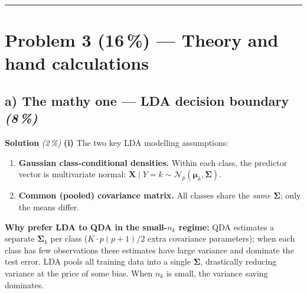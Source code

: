 \documentclass[11pt,a4paper]{article}
\newcommand{\points}[1]{\textbf{(#1\,\%)}}
\newcommand{\subpoints}[1]{\textit{(#1\,\%)}}
\newcommand{\sol}{\noindent\textbf{Solution}}
\begin{document}
\vspace{0.6em}
\hrule
\vspace{1em}

\section*{Problem 3 \points{16} --- Theory and hand calculations}

\subsection*{a) The mathy one --- LDA decision boundary \subpoints{8}}

\sol{} \subpoints{2} \textbf{(i)} The two key LDA modelling assumptions:
\begin{enumerate}
  \item \textbf{Gaussian class-conditional densities.} Within each class, the predictor vector is
        multivariate normal: $\mathbf{X}\mid Y=k\sim\mathcal{N}_p(\boldsymbol\mu_k,\boldsymbol\Sigma)$.
  \item \textbf{Common (pooled) covariance matrix.} All classes share the \emph{same} $\boldsymbol\Sigma$;
        only the means differ.
\end{enumerate}
\textbf{Why prefer LDA to QDA in the small-$n_k$ regime:} QDA estimates a separate
$\boldsymbol\Sigma_k$ per class ($K\cdot p(p+1)/2$ extra covariance parameters); when each class
has few observations these estimates have large variance and dominate the test error. LDA pools
all training data into a single $\boldsymbol\Sigma$, drastically reducing variance at the price
of some bias. When $n_k$ is small, the variance saving dominates.
\end{document}
